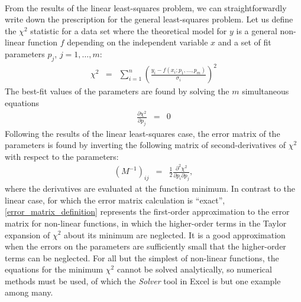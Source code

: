 \documentclass{article}
\begin{document}
\paragraph{}
From the results of the linear least-squares problem, we can straightforwardly write down the prescription for the general least-squares problem. Let us define the $\chi^2$ statistic for a data set where the theoretical model for $y$ is a general non-linear function $f$ depending on the independent variable $x$ and a set of fit parameters $p_j$, $j=1,\ldots,m$:
\begin{eqnarray}
  \chi^2 &=& \sum_{i=1}^{n} \left(\frac{y_i - f(x_i; p_1,\ldots,p_m)}{\sigma_i}\right)^2
\end{eqnarray}
The best-fit values of the parameters are found by solving the $m$ simultaneous equations 
\begin{eqnarray}
  \frac{\partial \chi^2}{\partial p_j} &=& 0
\end{eqnarray}
Following the results of the linear least-squares case, the error matrix of the parameters is found by inverting the following matrix of second-derivatives of $\chi^2$ with respect to the parameters:
\begin{eqnarray}
  \left(M^{-1}\right)_{ij} &=& \frac{1}{2} \frac{\partial^2 \chi^2}{\partial p_i \partial p_j}, \label{error_matrix_definition}
\end{eqnarray}
where the derivatives are evaluated at the function minimum. In contrast to the linear case, for which the error matrix calculation is ``exact'', \eqref{error_matrix_definition} represents the first-order approximation to the error matrix for non-linear functions, in which the higher-order terms in the Taylor expansion of $\chi^2$ about its minimum are neglected. It is a good approximation when the errors on the parameters are sufficiently small that the higher-order terms can be neglected. For all but the simplest of non-linear functions, the equations for the minimum $\chi^2$ cannot be solved analytically, so numerical methods must be used, of which the \emph{Solver} tool in Excel is but one example among many.
\end{document}
